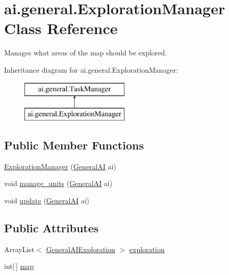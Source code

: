\hypertarget{classai_1_1general_1_1_exploration_manager}{
\section{ai.general.ExplorationManager Class Reference}
\label{classai_1_1general_1_1_exploration_manager}
}


Manages what areas of the map should be explored.  


Inheritance diagram for ai.general.ExplorationManager:\begin{figure}[H]
\begin{center}
\leavevmode
\includegraphics[height=2.000000cm]{classai_1_1general_1_1_exploration_manager}
\end{center}
\end{figure}
\subsection*{Public Member Functions}
\begin{DoxyCompactItemize}
\item 
\hyperlink{classai_1_1general_1_1_exploration_manager_af734bff0759137224eb49758eedeef80}{ExplorationManager} (\hyperlink{classai_1_1general_1_1_general_a_i}{GeneralAI} ai)
\item 
void \hyperlink{classai_1_1general_1_1_exploration_manager_acc70ee6c187e9317fdaa32b808580acc}{manage\_\-units} (\hyperlink{classai_1_1general_1_1_general_a_i}{GeneralAI} ai)
\item 
void \hyperlink{classai_1_1general_1_1_exploration_manager_ad505dd71852b360dc804dfbf160a0ea3}{update} (\hyperlink{classai_1_1general_1_1_general_a_i}{GeneralAI} ai)
\end{DoxyCompactItemize}
\subsection*{Public Attributes}
\begin{DoxyCompactItemize}
\item 
ArrayList$<$ \hyperlink{classai_1_1general_1_1_general_a_i_exploration}{GeneralAIExploration} $>$ \hyperlink{classai_1_1general_1_1_exploration_manager_a63a09349d3ddc2e08e0952a47dbdf4fc}{exploration}
\item 
int\mbox{[}$\,$\mbox{]} \hyperlink{classai_1_1general_1_1_exploration_manager_a5c5e2db3e60a4b27f7d43df9d2cbaf82}{map}
\end{DoxyCompactItemize}


